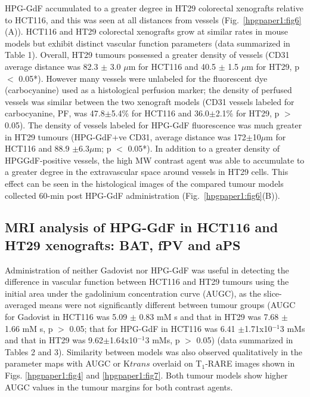 HPG-GdF accumulated to a greater degree in HT29 colorectal xenografts relative to HCT116, and this was seen at all distances from vessels (Fig.~\ref{hpgpaper1:fig6}(A)).
HCT116 and HT29 colorectal xenografts grow at similar rates in mouse models but exhibit distinct vascular function parameters (data summarized in Table 1).
Overall, HT29 tumours possessed a greater density of vessels (\acs{CD31} average distance was 82.3 $\pm$ 3.0 $\mu$m for HCT116 and 40.5 $\pm$ 1.5 $\mu$m for HT29, p $<$ 0.05*).
However many vessels were unlabeled for the fluorescent dye (carbocyanine) used as a histological perfusion marker; the density of perfused vessels was similar between the two xenograft models (\acs{CD31} vessels labeled for carbocyanine, PF, was 47.8$\pm$5.4\% for HCT116 and 36.0$\pm$2.1\% for HT29, p $>$ 0.05).
The density of vessels labeled for \acs{HPG-GdF} fluorescence was much greater in HT29 tumours (HPG-GdF+ve \acs{CD31}, average distance was 172$\pm$10$\mu$m for HCT116 and 88.9 $\pm$6.3$\mu$m; p $<$ 0.05*).
In addition to a greater density of HPGGdF-positive vessels, the high \acs{MW} contrast agent was able to accumulate to a greater degree in the extravascular space around vessels in HT29 cells.
This effect can be seen in the histological images of the compared tumour models collected 60-min post \acs{HPG-GdF} administration (Fig.~\ref{hpgpaper1:fig6}(B)).

\subsection{MRI analysis of \acs{HPG-GdF} in HCT116 and HT29 xenografts: \acs{BAT}, \acs{fPV} and aPS}

Administration of neither Gadovist nor \acs{HPG-GdF} was useful in detecting the difference in vascular function between HCT116 and HT29 tumours using the initial area under the gadolinium concentration curve (AUGC), as the slice-averaged means were not significantly different between tumour groups (AUGC for Gadovist in HCT116 was 5.09 $\pm$ 0.83 mM s and that in HT29 was 7.68 $\pm$ 1.66 mM s, p $>$ 0.05; that for \acs{HPG-GdF} in HCT116 was 6.41 $\pm$1.71x10$^{-1}$3 mMs and that in HT29 was 9.62$\pm$1.64x10$^{-1}$3 mMs, p $>$ 0.05) (data summarized in Tables 2 and 3).
Similarity between models was also observed qualitatively in the parameter maps with AUGC or K${trans}$ overlaid on T$_1$-RARE images shown in Figs.
\ref{hpgpaper1:fig4} and \ref{hpgpaper1:fig7}.
Both tumour models show higher AUGC values in the tumour margins for both contrast agents.

